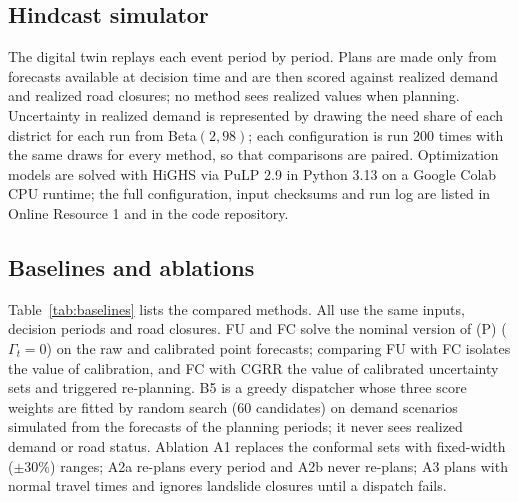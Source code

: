 \documentclass[pdflatex,sn-basic]{sn-jnl}
\theoremstyle{plain}%
\theoremstyle{remark}%
\theoremstyle{definition}%
\begin{document}
\subsection{Hindcast simulator}

The digital twin replays each event period by period. Plans are made only from forecasts available at decision time and are then scored against realized demand and realized road closures; no method sees realized values when planning. Uncertainty in realized demand is represented by drawing the need share of each district for each run from Beta$(2, 98)$; each configuration is run 200 times with the same draws for every method, so that comparisons are paired. Optimization models are solved with HiGHS \citep{HiGHS} via PuLP 2.9 in Python 3.13 on a Google Colab CPU runtime; the full configuration, input checksums and run log are listed in Online Resource 1 and in the code repository.

\subsection{Baselines and ablations}

Table~\ref{tab:baselines} lists the compared methods. All use the same inputs, decision periods and road closures. FU and FC solve the nominal version of (P) ($\Gamma_t=0$) on the raw and calibrated point forecasts; comparing FU with FC isolates the value of calibration, and FC with CGRR the value of calibrated uncertainty sets and triggered re-planning. B5 is a greedy dispatcher whose three score weights are fitted by random search (60 candidates) on demand scenarios simulated from the forecasts of the planning periods; it never sees realized demand or road status. Ablation A1 replaces the conformal sets with fixed-width ($\pm 30\%$) ranges; A2a re-plans every period and A2b never re-plans; A3 plans with normal travel times and ignores landslide closures until a dispatch fails.
\end{document}

